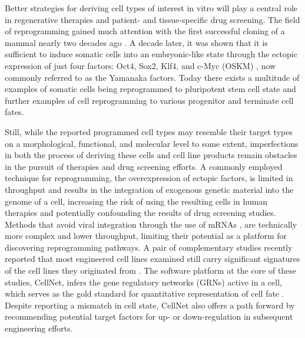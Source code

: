 \documentclass[10pt]{article}
\begin{document}
Better strategies for deriving cell types of interest in vitro will play a central role in regenerative therapies and patient- and tissue-specific drug screening. The field of reprogramming gained much attention with the first successful cloning of a mammal nearly two decades ago \cite{campbell1996sheep}. A decade later, it was shown that it is sufficient to induce somatic cells into an embryonic-like state through the ectopic expression of just four factors: Oct4, Sox2, Klf4, and c-Myc (OSKM) \cite{takahashi2006induction}, now commonly referred to as the Yamanaka factors. Today there exists a multitude of examples of somatic cells being reprogrammed to pluripotent stem cell state and further examples of cell reprogramming to various progenitor and terminate cell fates.

Still, while the reported programmed cell types may resemble their target types on a morphological, functional, and molecular level to some extent, imperfections in both the process of deriving these cells and cell line products remain obstacles in the pursuit of therapies and drug screening efforts. A commonly employed technique for reprogramming, the overexpression of ectopic factors, is limited in throughput and results in the integration of exogenous genetic material into the genome of a cell, increasing the risk of using the resulting cells in human therapies and potentially confounding the results of drug screening studies. Methods that avoid viral integration through the use of mRNAs \cite{warren2010highly}, are technically more complex and lower throughput, limiting their potential as a platform for discovering reprogramming pathways. A pair of complementary studies recently reported that most engineered cell lines examined still carry significant signatures of the cell lines they originated from \cite{cahan2014cellnet, morris2014dissecting}. The software platform at the core of these studies, CellNet, infers the gene regulatory networks (GRNs) active in a cell, which serves as the gold standard for quantitative representation of cell fate \cite{davidson2006gene}. Despite reporting a mismatch in cell state, CellNet also offers a path forward by recommending potential target factors for up- or down-regulation in subsequent engineering efforts.
\end{document}
